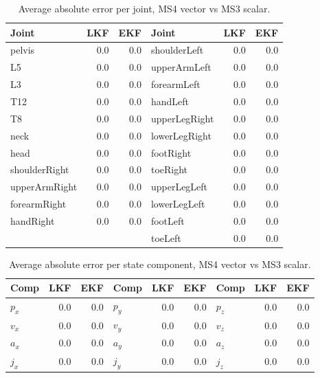 \documentclass[11pt,a4paper]{article}
\begin{document}
\begin{table}[h]
\centering
\caption{Average absolute error per joint, MS4 vector vs MS3 scalar.}
\begin{tabular}{lrr@{\hskip 2em}lrr}
\toprule
Joint           & LKF & EKF        & Joint            & LKF & EKF \\
\midrule
pelvis          & 0.0 & 0.0        & shoulderLeft     & 0.0 & 0.0 \\
L5              & 0.0 & 0.0        & upperArmLeft     & 0.0 & 0.0 \\
L3              & 0.0 & 0.0        & forearmLeft      & 0.0 & 0.0 \\
T12             & 0.0 & 0.0        & handLeft         & 0.0 & 0.0 \\
T8              & 0.0 & 0.0        & upperLegRight    & 0.0 & 0.0 \\
neck            & 0.0 & 0.0        & lowerLegRight    & 0.0 & 0.0 \\
head            & 0.0 & 0.0        & footRight        & 0.0 & 0.0 \\
shoulderRight   & 0.0 & 0.0        & toeRight         & 0.0 & 0.0 \\
upperArmRight   & 0.0 & 0.0        & upperLegLeft     & 0.0 & 0.0 \\
forearmRight    & 0.0 & 0.0        & lowerLegLeft     & 0.0 & 0.0 \\
handRight       & 0.0 & 0.0        & footLeft         & 0.0 & 0.0 \\
                &     &            & toeLeft          & 0.0 & 0.0 \\
\bottomrule
\end{tabular}
\end{table}

\begin{table}[h]
\centering
\caption{Average absolute error per state component, MS4 vector vs MS3 scalar.}
\begin{tabular}{lrr@{\hskip 2em}lrr@{\hskip 2em}lrr}
\toprule
Comp & LKF & EKF & Comp & LKF & EKF & Comp & LKF & EKF \\
\midrule
$p_x$ & 0.0 & 0.0 & $p_y$ & 0.0 & 0.0 & $p_z$ & 0.0 & 0.0 \\
$v_x$ & 0.0 & 0.0 & $v_y$ & 0.0 & 0.0 & $v_z$ & 0.0 & 0.0 \\
$a_x$ & 0.0 & 0.0 & $a_y$ & 0.0 & 0.0 & $a_z$ & 0.0 & 0.0 \\
$j_x$ & 0.0 & 0.0 & $j_y$ & 0.0 & 0.0 & $j_z$ & 0.0 & 0.0 \\
\bottomrule
\end{tabular}
\end{table}
\end{document}
